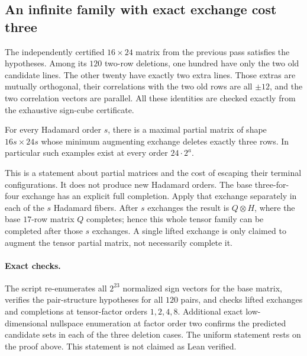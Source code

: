 \subsection{An infinite family with exact exchange cost three}
The independently certified $16\times24$ matrix from the previous pass
satisfies the hypotheses. Among its $120$ two-row deletions, one hundred
have only the two old candidate lines. The other twenty have exactly
two extra lines. Those extras are mutually orthogonal, their
correlations with the two old rows are all $\pm12$, and the two
correlation vectors are parallel. All these identities are checked
exactly from the exhaustive sign-cube certificate.

\begin{corollary}
For every Hadamard order $s$, there is a maximal partial matrix of
shape $16s\times24s$ whose minimum augmenting exchange deletes exactly
three rows. In particular such examples exist at every order
$24\cdot2^a$.
\end{corollary}

This is a statement about partial matrices and the cost of escaping
their terminal configurations. It does not produce new Hadamard orders.
The base three-for-four exchange has an explicit full completion. Apply
that exchange separately in each of the $s$ Hadamard fibers. After
$s$ exchanges the result is $Q\otimes H$, where the base $17$-row
matrix $Q$ completes; hence this whole tensor family can be completed
after those $s$ exchanges. A single lifted exchange is only claimed
to augment the tensor partial matrix, not necessarily complete it.

\paragraph{Exact checks.}
The script  re-enumerates all $2^{23}$
normalized sign vectors for the base matrix, verifies the pair-structure
hypotheses for all $120$ pairs, and checks lifted exchanges and
completions at tensor-factor orders $1,2,4,8$. Additional exact
low-dimensional nullspace enumeration at factor order two confirms
the predicted candidate sets in each of the three deletion cases.
The uniform statement rests on the proof above. This statement is not claimed as Lean verified.

